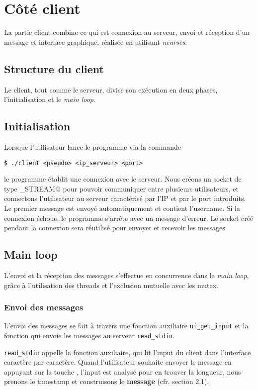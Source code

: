 \section{Côté client}

La partie client combine ce qui est connexion au serveur,
envoi et réception d'un message et interface graphique,
réalisée en utilisant \emph{ncurses}.

\subsection{Structure du client}

Le client, tout comme le serveur, divise son exécution
en deux phases, l'initialisation et le \emph{main loop}.

\subsection{Initialisation}

Lorsque l'utilisateur lance le programme via la commande
\begin{center}
    \texttt{\$ ./client <pseudo> <ip\_serveur> <port>}
\end{center}

le programme établit une
connexion avec le serveur.
Nous créons un socket de type \verb@SOCK_STREAM@ pour pouvoir communiquer entre
plusieurs utilisateurs, et connectons l'utilisateur au serveur caractérisé
par l'IP et par le port introduits.
Le premier message est envoyé automatiquement et contient l'username.
Si la connexion échoue, le programme s'arrête avec un message d'erreur.
Le socket créé pendant la connexion sera réutilisé pour envoyer et recevoir les messages.
\subsection{Main loop}
L'envoi et la réception des messages s'effectue en concurrence dans le \emph{main loop},
grâce à l'utilisation des threads et l'exclusion mutuelle avec les mutex.
\subsubsection{Envoi des messages}
L'envoi des messages se fait à travers une fonction auxiliaire
\texttt{ui\_get\_input} et la fonction qui envoie les messages
au serveur \texttt{read\_stdin}.

\texttt{read\_stdin} appelle la fonction auxiliaire,
qui lit l'input du client dans l'interface
caractère par caractère. Quand l'utilisateur souhaite
envoyer le message en appuyant sur la touche , l'input est analysé
pour en trouver la longueur, nous prenons le timestamp et
construisons le \verb@struct@ \textbf{message} (cfr. section 2.1).

